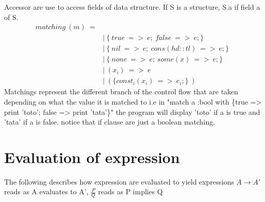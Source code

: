 \documentclass[10pt,a4paper]{article}
\begin{document}
Accessor are use to access fields of data structure. If S is a structure, S.a if field a of S. 
\begin{align*}
matching\ (m)\ = 
\\
 \ &|\ \{\ true\ =>\ e;\ false\ =>\ e;\}       \ \tag{match\ bool}
\\
 \ &|\ \{\ nil \ =>\ e;\ cons(hd::tl)\ =>\ e;\}\ \tag{match\ list}
\\
 \ &|\ \{\ none\ =>\ e;\ some(x) \ =>\ e;\}    \ \tag{match\ option}
\\
 \ &|\ (x_i) \ =>\ e                     \ \tag{match\ tuple}
\\
 \ &|\ (\{const_i(x_i)\ =>\ e_i;\}\ )       \ \tag{match\ variant}
\end{align*}
Matchings represent the different branch of the control flow that are taken depending on what the value 
it is matched to i.e in "match a :bool with \{true => print 'toto'; false => print 'tata'\}" the program 
will display 'toto' if a is true and 'tata' if a is false. notice that if clause are just a boolean matching.

\section*{ Evaluation of expression }
The following describes how expression are evaluated to yield expressions $A \rightarrow  A'$ reads as A evaluates to A', $\frac{P}{Q}$ reads as P implies Q
\end{document}
